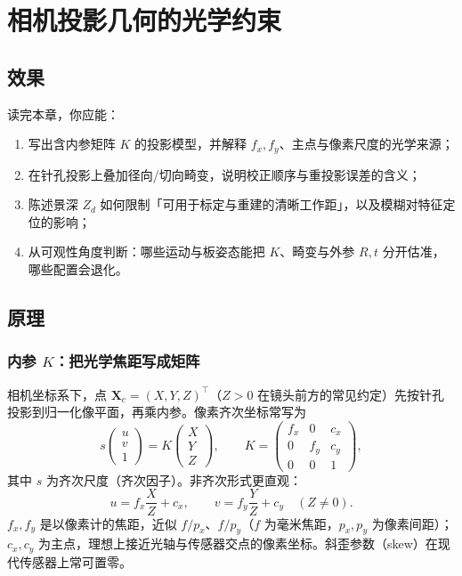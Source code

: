 \chapter{相机投影几何的光学约束}
\label{ch:02}

\section{效果}
\label{sec:ch02-effect}

读完本章，你应能：
\begin{enumerate}
  \item 写出含内参矩阵 $K$ 的投影模型，并解释 $f_x,f_y$、主点与像素尺度的光学来源；
  \item 在针孔投影上叠加径向/切向畸变，说明校正顺序与重投影误差的含义；
  \item 陈述景深 $Z_d$ 如何限制「可用于标定与重建的清晰工作距」，以及模糊对特征定位的影响；
  \item 从可观性角度判断：哪些运动与板姿态能把 $K$、畸变与外参 $R,t$ 分开估准，哪些配置会退化。
\end{enumerate}

\section{原理}
\label{sec:ch02-principle}

\subsection{内参 $K$：把光学焦距写成矩阵}

相机坐标系下，点 $\mathbf{X}_c=(X,Y,Z)^\top$（$Z>0$ 在镜头前方的常见约定）先按针孔投影到归一化像平面，再乘内参。像素齐次坐标常写为
\begin{equation}
  s\begin{pmatrix}u\\v\\1\end{pmatrix}
  =
  K\begin{pmatrix}X\\Y\\Z\end{pmatrix},
  \qquad
  K=\begin{pmatrix}f_x & 0 & c_x\\ 0 & f_y & c_y\\ 0&0&1\end{pmatrix},
  \label{eq:ch02-K}
\end{equation}
其中 $s$ 为齐次尺度（齐次因子）。非齐次形式更直观：
\[
  u = f_x\frac{X}{Z}+c_x,\qquad
  v = f_y\frac{Y}{Z}+c_y
  \quad(Z\neq 0).
\]
$f_x,f_y$ 是以像素计的焦距，近似 $f/p_x$、$f/p_y$（$f$ 为毫米焦距，$p_x,p_y$ 为像素间距）；$c_x,c_y$ 为主点，理想上接近光轴与传感器交点的像素坐标。斜歪参数（skew）在现代传感器上常可置零。

